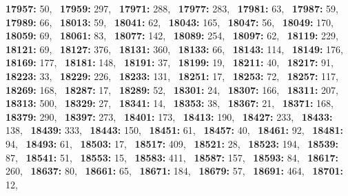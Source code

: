 \textbf{17957:} 50,\allowbreak~ 
\textbf{17959:} 297,\allowbreak~ 
\textbf{17971:} 288,\allowbreak~ 
\textbf{17977:} 283,\allowbreak~ 
\textbf{17981:} 63,\allowbreak~ 
\textbf{17987:} 59,\allowbreak~ 
\textbf{17989:} 66,\allowbreak~ 
\textbf{18013:} 59,\allowbreak~ 
\textbf{18041:} 62,\allowbreak~ 
\textbf{18043:} 165,\allowbreak~ 
\textbf{18047:} 56,\allowbreak~ 
\textbf{18049:} 170,\allowbreak~ 
\textbf{18059:} 69,\allowbreak~ 
\textbf{18061:} 83,\allowbreak~ 
\textbf{18077:} 142,\allowbreak~ 
\textbf{18089:} 254,\allowbreak~ 
\textbf{18097:} 62,\allowbreak~ 
\textbf{18119:} 229,\allowbreak~ 
\textbf{18121:} 69,\allowbreak~ 
\textbf{18127:} 376,\allowbreak~ 
\textbf{18131:} 360,\allowbreak~ 
\textbf{18133:} 66,\allowbreak~ 
\textbf{18143:} 114,\allowbreak~ 
\textbf{18149:} 176,\allowbreak~ 
\textbf{18169:} 177,\allowbreak~ 
\textbf{18181:} 148,\allowbreak~ 
\textbf{18191:} 37,\allowbreak~ 
\textbf{18199:} 19,\allowbreak~ 
\textbf{18211:} 40,\allowbreak~ 
\textbf{18217:} 91,\allowbreak~ 
\textbf{18223:} 33,\allowbreak~ 
\textbf{18229:} 226,\allowbreak~ 
\textbf{18233:} 131,\allowbreak~ 
\textbf{18251:} 17,\allowbreak~ 
\textbf{18253:} 72,\allowbreak~ 
\textbf{18257:} 117,\allowbreak~ 
\textbf{18269:} 168,\allowbreak~ 
\textbf{18287:} 17,\allowbreak~ 
\textbf{18289:} 52,\allowbreak~ 
\textbf{18301:} 24,\allowbreak~ 
\textbf{18307:} 166,\allowbreak~ 
\textbf{18311:} 207,\allowbreak~ 
\textbf{18313:} 500,\allowbreak~ 
\textbf{18329:} 27,\allowbreak~ 
\textbf{18341:} 14,\allowbreak~ 
\textbf{18353:} 38,\allowbreak~ 
\textbf{18367:} 21,\allowbreak~ 
\textbf{18371:} 168,\allowbreak~ 
\textbf{18379:} 290,\allowbreak~ 
\textbf{18397:} 273,\allowbreak~ 
\textbf{18401:} 173,\allowbreak~ 
\textbf{18413:} 190,\allowbreak~ 
\textbf{18427:} 233,\allowbreak~ 
\textbf{18433:} 138,\allowbreak~ 
\textbf{18439:} 333,\allowbreak~ 
\textbf{18443:} 150,\allowbreak~ 
\textbf{18451:} 61,\allowbreak~ 
\textbf{18457:} 40,\allowbreak~ 
\textbf{18461:} 92,\allowbreak~ 
\textbf{18481:} 94,\allowbreak~ 
\textbf{18493:} 61,\allowbreak~ 
\textbf{18503:} 17,\allowbreak~ 
\textbf{18517:} 409,\allowbreak~ 
\textbf{18521:} 28,\allowbreak~ 
\textbf{18523:} 194,\allowbreak~ 
\textbf{18539:} 87,\allowbreak~ 
\textbf{18541:} 51,\allowbreak~ 
\textbf{18553:} 15,\allowbreak~ 
\textbf{18583:} 411,\allowbreak~ 
\textbf{18587:} 157,\allowbreak~ 
\textbf{18593:} 84,\allowbreak~ 
\textbf{18617:} 260,\allowbreak~ 
\textbf{18637:} 80,\allowbreak~ 
\textbf{18661:} 65,\allowbreak~ 
\textbf{18671:} 184,\allowbreak~ 
\textbf{18679:} 57,\allowbreak~ 
\textbf{18691:} 464,\allowbreak~ 
\textbf{18701:} 12,\allowbreak~ 
